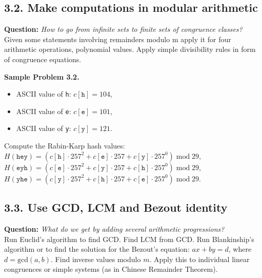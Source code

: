 \documentclass[jou]{apa6}
\begin{document}
\subsection{3.2. Make computations in modular arithmetic}

{\bf Question:} {\em How to go from infinite sets to finite sets of congruence classes?}\\
{\scriptsize 
Given some statements involving remainders modulo m apply it for four 
arithmetic operations, polynomial values. 
Apply simple divisibility rules in form of congruence equations. 
}


\vspace{6pt}
{\bf Sample Problem 3.2.}
\begin{itemize}
\item ASCII value of {\tt h}: $c[\mathtt{h}]=104$,
\item ASCII value of {\tt e}: $c[\mathtt{e}]=101$,
\item ASCII value of {\tt y}: $c[\mathtt{y}]=121$.
\end{itemize}

Compute the Rabin-Karp hash values:\\
$H(\mathtt{hey}) = (c[\mathtt{h}] \cdot 257^2 + c[\mathtt{e}] \cdot 257 + c[\mathtt{y}] \cdot 257^0)\;\text{mod}\;29$,\\
$H(\mathtt{eyh}) = (c[\mathtt{e}] \cdot 257^2 + c[\mathtt{y}] \cdot 257 + c[\mathtt{h}] \cdot 257^0)\;\text{mod}\;29$,\\
$H(\mathtt{yhe}) = (c[\mathtt{y}] \cdot 257^2 + c[\mathtt{h}] \cdot 257 + c[\mathtt{e}] \cdot 257^0)\;\text{mod}\;29$.




\subsection{3.3. Use GCD, LCM and Bezout identity}

{\bf Question:} {\em What do we get by adding several arithmetic progressions?}\\
{\scriptsize 
Run Euclid’s algorithm to find GCD. Find LCM from GCD. Run Blankinship’s algorithm 
or to find the solution for the Bezout’s equation: $ax + by = d$, where $d = \text{gcd}(a,b)$. 
Find inverse values modulo $m$. Apply this to individual linear congruences 
or simple systems (as in Chinese Remainder Theorem).
}
\end{document}
